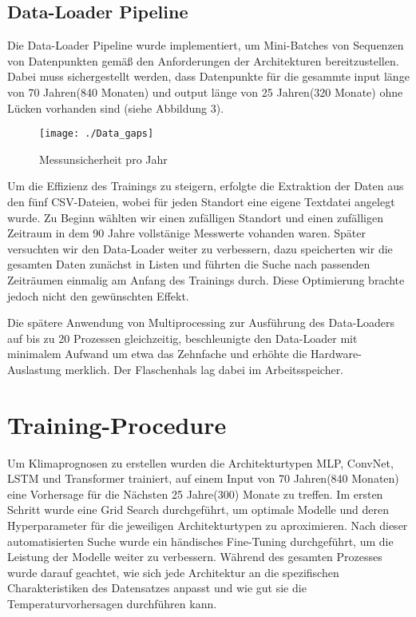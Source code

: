 \documentclass[acmtog, authorversion]{acmart} %
\begin{document}
\subsection{Data-Loader Pipeline} %
Die Data-Loader Pipeline wurde implementiert, um Mini-Batches von Sequenzen von Datenpunkten gemäß den Anforderungen der Architekturen bereitzustellen. Dabei muss sichergestellt werden, dass Datenpunkte für die gesammte input länge von 70 Jahren(840 Monaten) und output länge von 25 Jahren(320 Monate) ohne Lücken vorhanden sind (siehe Abbildung 3).
\begin{figure}[H]
    \flushleft
    \texttt{[image: ./Data\_gaps]}
    \label{fig:sub3}
    \caption{Messunsicherheit pro Jahr}
\end{figure}
Um die Effizienz des Trainings zu steigern, erfolgte die Extraktion der Daten aus den fünf CSV-Dateien, wobei für jeden Standort eine eigene Textdatei angelegt wurde. Zu Beginn wählten wir einen zufälligen Standort und einen zufälligen Zeitraum in dem 90 Jahre vollstänige Messwerte vohanden waren.
Später versuchten wir den Data-Loader weiter zu verbessern, dazu speicherten wir die gesamten Daten zunächst in Listen und führten die Suche nach passenden Zeiträumen einmalig am Anfang des Trainings durch. Diese Optimierung brachte jedoch nicht den gewünschten Effekt.

Die spätere Anwendung von Multiprocessing zur Ausführung des Data-Loaders auf bis zu 20 Prozessen gleichzeitig, beschleunigte den Data-Loader mit minimalem Aufwand um etwa das Zehnfache und erhöhte die Hardware-Auslastung merklich. Der Flaschenhals lag dabei im Arbeitsspeicher.

\section{Training-Procedure}

Um Klimaprognosen zu erstellen wurden die Architekturtypen MLP, ConvNet, LSTM und Transformer trainiert, auf einem Input von 70 Jahren(840 Monaten) eine Vorhersage für die Nächsten 25 Jahre(300) Monate zu treffen.
Im ersten Schritt wurde eine Grid Search durchgeführt, um optimale Modelle und deren Hyperparameter für die jeweiligen Architekturtypen zu aproximieren. 
Nach dieser automatisierten Suche wurde ein händisches Fine-Tuning durchgeführt, um die Leistung der Modelle weiter zu verbessern. 
Während des gesamten Prozesses wurde darauf geachtet, wie sich jede Architektur an die spezifischen Charakteristiken des Datensatzes anpasst und 
wie gut sie die Temperaturvorhersagen durchführen kann.
\end{document}
